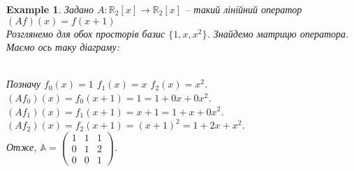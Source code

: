 \documentclass[a4paper, 10pt]{article}
\theoremstyle{theoremdd}
\newtheorem{example}[theorem]{Example}
\begin{document}
	\begin{example}
	Задано $A \colon \mathbb{R}_2[x] \to \mathbb{R}_2[x]$ -- такий лінійний оператор\\
	$(Af)(x) = f(x+1)$\\
	Розглянемо для обох просторів базис $\{1,x,x^2\}$. Знайдемо матрицю оператора.\\
	Маємо ось таку діаграму:\\
	\\
	Позначу $f_0(x) = 1$ \hspace{0.5cm} $f_1(x) = x$ \hspace{0.5cm} $f_2(x) = x^2$.\\
	$(Af_0)(x) = f_0(x+1) = 1 = 1 + 0x + 0x^2$.\\
	$(Af_1)(x) = f_1(x+1) = x+1 = 1 + x + 0x^2$.\\
	$(Af_2)(x) = f_2(x+1) = (x+1)^2 = 1 + 2x + x^2$.\\
	Отже, $\mathbb{A} = \begin{pmatrix}
	1 & 1 & 1 \\
	0 & 1 & 2 \\
	0 & 0 & 1 
	\end{pmatrix}$.
	\end{example}
	
\end{document}

